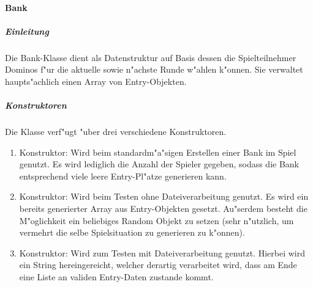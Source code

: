 \paragraph{Bank}
\label{par:bank}

\subparagraph{Einleitung}
Die Bank-Klasse dient als Datenstruktur auf Basis dessen die Spielteilnehmer Dominos f"ur die aktuelle sowie n"achste Runde w"ahlen k"onnen. Sie verwaltet haupts"achlich einen Array von Entry-Objekten. 

\subparagraph{Konstruktoren}
Die Klasse verf"ugt "uber drei verschiedene Konstruktoren. 
\begin{enumerate}
	\item Konstruktor: Wird beim standardm"a"sigen Erstellen einer Bank im Spiel genutzt. Es wird lediglich die Anzahl der Spieler gegeben, sodass die Bank entsprechend viele leere Entry-Pl"atze generieren kann. 
	\item Konstruktor: Wird beim Testen ohne Dateiverarbeitung genutzt. Es wird ein bereits generierter Array aus Entry-Objekten gesetzt. Au"serdem besteht die M"oglichkeit ein beliebiges Random Objekt zu setzen (sehr n"utzlich, um vermehrt die selbe Spielsituation zu generieren zu k"onnen). 
	\item Konstruktor: Wird zum Testen mit Dateiverarbeitung genutzt. Hierbei wird ein String hereingereicht, welcher derartig verarbeitet wird, dass am Ende eine Liste an validen Entry-Daten zustande kommt. 
\end{enumerate}

